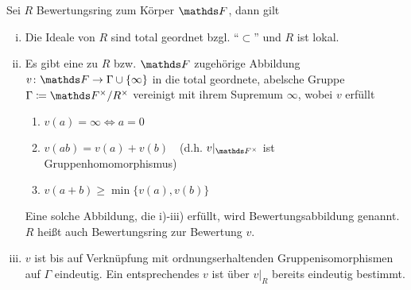 \documentclass[ngerman,fontsize=11pt, paper=a4, parskip=half, titlepage=true, toc=bib]{scrartcl}
\begin{document}
\begin{Lem}\label{eigbewertungsring}
  Sei $R$ Bewertungsring zum Körper $\F$, dann gilt
  \begin{enumerate}[i)]
  \item Die Ideale von $R$ sind total geordnet bzgl. 
    \enquote{$\subset$} und $R$ ist lokal.
  \item Es gibt eine zu $R$ bzw. $\F$ zugehörige Abbildung
    $v\colon\F\to\Gamma\cup\{\infty\}$ in die total geordnete, abelsche Gruppe
    $\Gamma\coloneqq \Fx/\Rx$ vereinigt mit ihrem Supremum $\infty$, wobei $v$ erfüllt
    \begin{enumerate}[(1)]
    \item $v(a)=\infty \Longleftrightarrow a=0$
    \item $v(ab)=v(a)+v(b)$~~(d.h. $v|_{\Fx}$ ist Gruppenhomomorphismus)
    \item $v(a+b)\geq \min\{v(a),v(b)\}$
    \end{enumerate}
    Eine solche Abbildung, die i)-iii) erfüllt,
    wird Bewertungsabbildung genannt.
    $R$ heißt auch Bewertungsring zur Bewertung $v$.
  \item $v$ ist bis auf Verknüpfung mit ordnungserhaltenden 
    Gruppenisomorphismen auf $\Gamma$ eindeutig.
    Ein entsprechendes $v$ ist über $v|_{R}$ bereits eindeutig 
    bestimmt.
  \end{enumerate}


\end{Lem}
\end{document}
